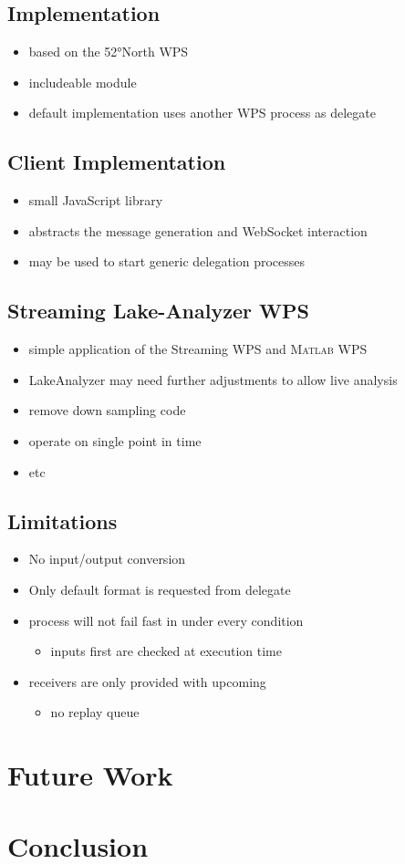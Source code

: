 	\subsection{Implementation}
	\begin{itemize}
		\item based on the 52°North WPS
		\item includeable module
		\item default implementation uses another WPS process as delegate
	\end{itemize}
	\subsection{Client Implementation}
	\begin{itemize}
		\item small JavaScript library
		\item abstracts the message generation and WebSocket interaction
		\item may be used to start generic delegation processes
	\end{itemize}
	\subsection{Streaming Lake-Analyzer WPS}
	\begin{itemize}
		\item simple application of the Streaming WPS and \textsc{Matlab} WPS
		\item LakeAnalyzer may need further adjustments to allow live analysis
		\item remove down sampling code
		\item operate on single point in time
		\item etc
	\end{itemize}
	\subsection{Limitations}
	\begin{itemize}
		\item No input/output conversion
		\item Only default format is requested from delegate
		\item process will not fail fast in under every condition
		\begin{itemize}
			\item inputs first are checked at execution time
		\end{itemize}
		\item receivers are only provided with upcoming
		\begin{itemize}
			\item no replay queue
		\end{itemize}
	\end{itemize}
\section{Future Work}
\section{Conclusion}